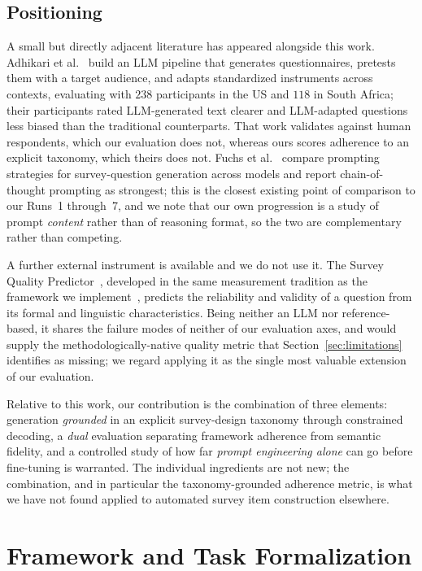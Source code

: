 \documentclass[onecolumn, 11pt]{IEEEtran}
\begin{document}
\subsection{Positioning}
A small but directly adjacent literature has appeared alongside this work. Adhikari et al.~\cite{adhikari2025exploring} build an LLM pipeline that generates questionnaires, pretests them with a target audience, and adapts standardized instruments across contexts, evaluating with $238$ participants in the US and $118$ in South Africa; their participants rated LLM-generated text clearer and LLM-adapted questions less biased than the traditional counterparts. That work validates against human respondents, which our evaluation does not, whereas ours scores adherence to an explicit taxonomy, which theirs does not. Fuchs et al.~\cite{fuchs2026aisurvey} compare prompting strategies for survey-question generation across models and report chain-of-thought prompting as strongest; this is the closest existing point of comparison to our Runs~1 through~7, and we note that our own progression is a study of prompt \emph{content} rather than of reasoning format, so the two are complementary rather than competing.

A further external instrument is available and we do not use it. The Survey Quality Predictor~\cite{sqp2022}, developed in the same measurement tradition as the framework we implement~\cite{saris2014design}, predicts the reliability and validity of a question from its formal and linguistic characteristics. Being neither an LLM nor reference-based, it shares the failure modes of neither of our evaluation axes, and would supply the methodologically-native quality metric that Section~\ref{sec:limitations} identifies as missing; we regard applying it as the single most valuable extension of our evaluation.

Relative to this work, our contribution is the combination of three elements: generation \emph{grounded} in an explicit survey-design taxonomy through constrained decoding, a \emph{dual} evaluation separating framework adherence from semantic fidelity, and a controlled study of how far \emph{prompt engineering alone} can go before fine-tuning is warranted. The individual ingredients are not new; the combination, and in particular the taxonomy-grounded adherence metric, is what we have not found applied to automated survey item construction elsewhere.


\section{Framework and Task Formalization}
\label{sec:framework}
\end{document}
